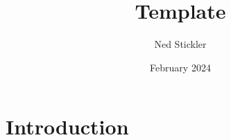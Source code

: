 \documentclass{article}
\title{Template}
\author{Ned Stickler}
\date{February 2024}
\begin{document}
\maketitle

\section{Introduction}
\end{document}
